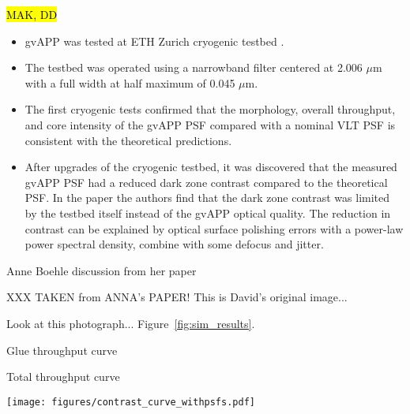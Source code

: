 \documentclass{aa}
\begin{document}
\hl{MAK, DD}

\begin{itemize}
    \item gvAPP was tested at ETH Zurich cryogenic testbed \citep{2018SPIE10702E..3YB,2021JATIS...7d5001B}. 
    \item The testbed was operated using a narrowband filter centered at 2.006 $\mu$m with a full width at half maximum of 0.045 $\mu$m.  
    \item The first cryogenic tests confirmed  that the morphology, overall throughput, and core intensity of the gvAPP PSF compared with a nominal VLT PSF is consistent with the theoretical predictions.
    \item After upgrades of the cryogenic testbed, it was discovered that the measured gvAPP PSF had a reduced dark zone contrast compared to the theoretical PSF. In the paper the authors find that the dark zone contrast was limited by the testbed itself instead of the gvAPP optical quality. The reduction in contrast can be explained by optical surface polishing errors with a power-law power spectral density, combine with some defocus and jitter.
\end{itemize}

Anne Boehle discussion from her paper

XXX TAKEN from ANNA's PAPER! This is David's original image...

Look at this photograph... Figure~\ref{fig:sim_results}.

Glue throughput curve

Total throughput curve

\begin{figure*}
    \centering
    \texttt{[image: figures/contrast\_curve\_withpsfs.pdf]}
    \caption{Results from the simulations of the aberrations  observed in the gvAPP PSF.
    The left column displays the simulated contrast curves when applying a a single realization of a power law aberration to simulate polishing errors (panel a), defocus and jitter aberrations (panel b), and all 3 aberrations combined including the average of 100 power law realizations and the 1$\sigma$ spread (panel c).
    Each simulated contrast curve is compared to the data (black points) and to the theoretical gvAPP PSF (gray line).
    The right column shows the test bench data of the left gvAPP PSF (panel d) compared to the simulated PSF with all 3 aberrations included (panel e).
    We find that including polishing errors adds flux to the gvAPP dark hole as seen in the test bench measurements and that adding defocus and jitter smooths the PSF and makes the inner and outer edges of the dark hole line up with the measurements.
    The combination of all three aberrations can explain the data very well in terms of the contrast curve and the PSF morphology.}
    \label{fig:sim_results}
\end{figure*}
\end{document}
